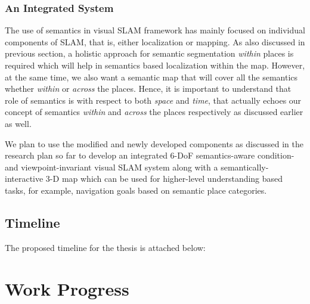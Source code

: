 \documentclass{article}
\begin{document}
\subsubsection{An Integrated System}
The use of semantics in visual SLAM framework has mainly focused on individual components of SLAM, that is, either localization or mapping. As also discussed in previous section, a holistic approach for semantic segmentation \emph{within} places is required which will help in semantics based localization within the map. However, at the same time, we also want a semantic map that will cover all the semantics whether \emph{within} or \emph{across} the places. Hence, it is important to understand that role of semantics is with respect to both \emph{space} and \emph{time}, that actually echoes our concept of semantics \emph{within} and \emph{across} the places respectively as discussed earlier as well.

We plan to use the modified and newly developed components as discussed in the research plan so far to develop an integrated 6-DoF semantics-aware condition- and viewpoint-invariant visual SLAM system along with a semantically-interactive 3-D map which can be used for higher-level understanding based tasks, for example, navigation goals based on semantic place categories.

\subsection{Timeline}
The proposed timeline for the thesis is attached below:

\begin{figure}[!htbp]
\centering
 \label{fig:Timeline}
\end{figure}


\section{Work Progress}
\end{document}
